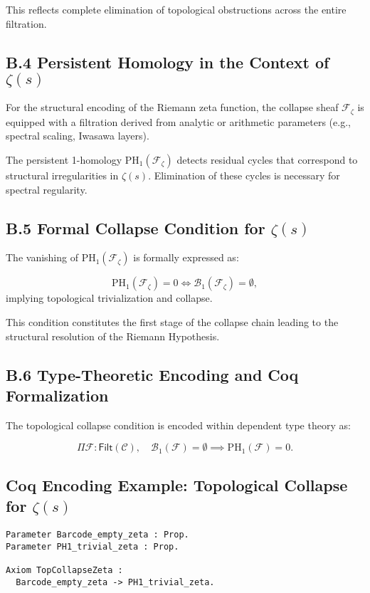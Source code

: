 \documentclass[11pt]{article}
\begin{document}
This reflects complete elimination of topological obstructions across the entire filtration.

\subsection*{B.4 Persistent Homology in the Context of $\zeta(s)$}

For the structural encoding of the Riemann zeta function, the collapse sheaf $\mathcal{F}_{\zeta}$ is equipped with a filtration derived from analytic or arithmetic parameters (e.g., spectral scaling, Iwasawa layers).

The persistent 1-homology $\mathrm{PH}_1(\mathcal{F}_{\zeta})$ detects residual cycles that correspond to structural irregularities in $\zeta(s)$. Elimination of these cycles is necessary for spectral regularity.

\subsection*{B.5 Formal Collapse Condition for $\zeta(s)$}

The vanishing of $\mathrm{PH}_1(\mathcal{F}_{\zeta})$ is formally expressed as:

\[
\mathrm{PH}_1(\mathcal{F}_{\zeta}) = 0 \iff \mathcal{B}_1(\mathcal{F}_{\zeta}) = \emptyset,
\]
implying topological trivialization and collapse.

This condition constitutes the first stage of the collapse chain leading to the structural resolution of the Riemann Hypothesis.

\subsection*{B.6 Type-Theoretic Encoding and Coq Formalization}

The topological collapse condition is encoded within dependent type theory as:

\[
\Pi \mathcal{F} : \mathsf{Filt}(\mathcal{C}), \quad \mathcal{B}_1(\mathcal{F}) = \emptyset \implies \mathrm{PH}_1(\mathcal{F}) = 0.
\]

\subsection*{Coq Encoding Example: Topological Collapse for $\zeta(s)$}

\begin{lstlisting}[language=Coq, caption=Coq Formalization of Topological Collapse for $\zeta(s)$, captionpos=b]
Parameter Barcode_empty_zeta : Prop.
Parameter PH1_trivial_zeta : Prop.

Axiom TopCollapseZeta :
  Barcode_empty_zeta -> PH1_trivial_zeta.
\end{lstlisting}
\end{document}
